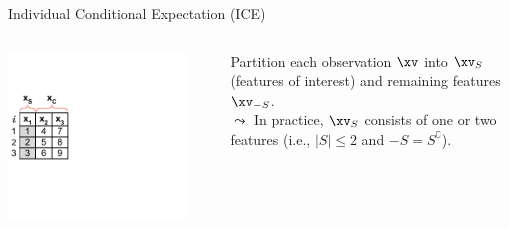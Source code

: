 \documentclass[11pt,compress,t,notes=noshow, aspectratio=169, xcolor=table]{beamer}
\begin{document}
\begin{frame}{Individual Conditional Expectation (ICE) }

\begin{columns}[T]
\begin{column}{0.16\textwidth} %
\includegraphics[page=1, trim=0cm 0.35cm 4.53cm 0.35cm, clip, width=0.9\textwidth]{figure_man/ice_plot_demo}
\end{column}
\begin{column}{0.84\textwidth}


Partition each observation $\xv$ into $\xv_S$ (features of interest) and remaining features $\xv_{-S}$.\\
$\leadsto$ In practice, $\xv_S$ consists of one or two features (i.e., $|S| \leq 2$ and ${-S} = S^\complement$).


\end{column}
\end{columns}
\end{frame}
\end{document}
